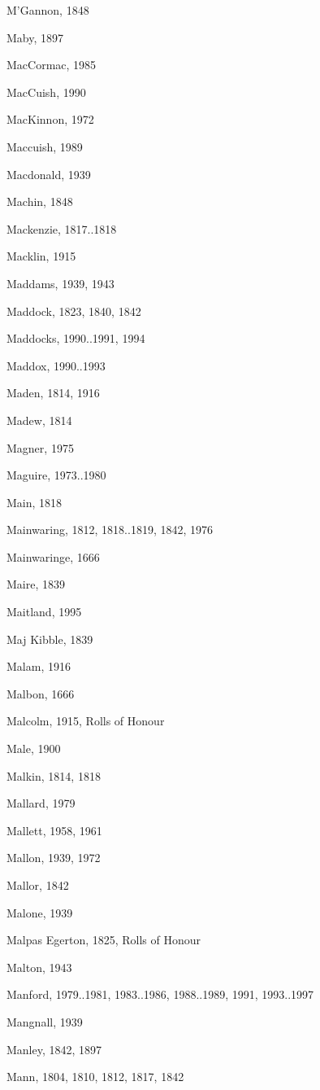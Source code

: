 \begin{theindex}
\item M'Gannon, 1848
\item Maby, 1897
\item MacCormac, 1985
\item MacCuish, 1990
\item MacKinnon, 1972
\item Maccuish, 1989
\item Macdonald, 1939
\item Machin, 1848
\item Mackenzie, 1817..1818
\item Macklin, 1915
\item Maddams, 1939, 1943
\item Maddock, 1823, 1840, 1842
\item Maddocks, 1990..1991, 1994
\item Maddox, 1990..1993
\item Maden, 1814, 1916
\item Madew, 1814
\item Magner, 1975
\item Maguire, 1973..1980
\item Main, 1818
\item Mainwaring, 1812, 1818..1819, 1842, 1976
\item Mainwaringe, 1666
\item Maire, 1839
\item Maitland, 1995
\item Maj Kibble, 1839
\item Malam, 1916
\item Malbon, 1666
\item Malcolm, 1915, Rolls of Honour
\item Male, 1900
\item Malkin, 1814, 1818
\item Mallard, 1979
\item Mallett, 1958, 1961
\item Mallon, 1939, 1972
\item Mallor, 1842
\item Malone, 1939
\item Malpas Egerton, 1825, Rolls of Honour
\item Malton, 1943
\item Manford, 1979..1981, 1983..1986, 1988..1989, 1991, 1993..1997
\item Mangnall, 1939
\item Manley, 1842, 1897
\item Mann, 1804, 1810, 1812, 1817, 1842

\end{theindex}
